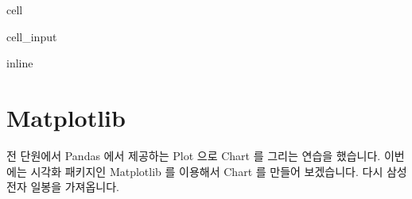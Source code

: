 \documentclass[letterpaper,10pt,english]{jupyterBook}
\begin{document}
\begin{sphinxuseclass}{cell}\begin{sphinxVerbatimInput}

\begin{sphinxuseclass}{cell_input}
\begin{sphinxVerbatim}[commandchars=\\\{\}]
   
 inline
\end{sphinxVerbatim}

\end{sphinxuseclass}\end{sphinxVerbatimInput}

\end{sphinxuseclass}

\section{Matplotlib}
\label{\detokenize{chapter2/2.3.2_Visualization:matplotlib}}\label{\detokenize{chapter2/2.3.2_Visualization::doc}}
\sphinxAtStartPar
전 단원에서 Pandas 에서 제공하는 Plot 으로 Chart 를 그리는 연습을 했습니다. 이번에는 시각화 패키지인 Matplotlib 를 이용해서 Chart 를 만들어 보겠습니다. 다시 삼성전자 일봉을 가져옵니다.
\end{document}
